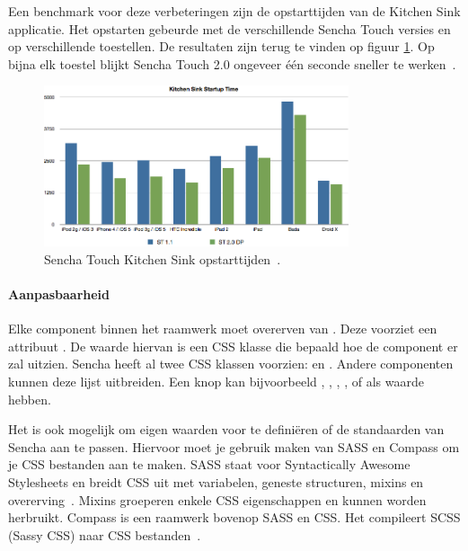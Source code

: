 Een benchmark voor deze verbeteringen zijn de opstarttijden van de Kitchen Sink applicatie.  Het opstarten gebeurde met de verschillende Sencha Touch versies en op verschillende toestellen.  De resultaten zijn terug te vinden op figuur \ref{fig:sencha_performance}.  Op bijna elk toestel blijkt Sencha Touch 2.0 ongeveer één seconde sneller te werken~\cite{SenchaInc.2013}.

\begin{figure}
  \centering
  \includegraphics[width=0.8\textwidth]{figuren/sencha-touch-startup-times.png}
  \caption{Sencha Touch Kitchen Sink opstarttijden~\cite{SenchaInc.2013}.}
  \label{fig:sencha_performance}
\end{figure}

\paragraph{Aanpasbaarheid}
\label{sec:sencha-aanpasbaarheid}
Elke component binnen het raamwerk moet overerven van .  Deze voorziet een attribuut .  De waarde hiervan is een CSS klasse die bepaald hoe de component er zal uitzien.  Sencha heeft al twee CSS klassen voorzien:   en .  Andere componenten kunnen deze lijst uitbreiden.  Een knop kan bijvoorbeeld ,  ,  ,  ,   of  als  waarde hebben.

Het is ook mogelijk om eigen waarden voor  te definiëren of de standaarden van Sencha aan te passen.  Hiervoor moet je gebruik maken van SASS en Compass om je CSS bestanden aan te maken.  SASS staat voor Syntactically Awesome Stylesheets en breidt CSS uit met variabelen,  geneste structuren,  mixins en overerving~\cite{Eppstein2013}.  Mixins groeperen enkele CSS eigenschappen en kunnen worden herbruikt.  Compass is een raamwerk bovenop SASS en CSS.  Het compileert SCSS (Sassy CSS) naar CSS bestanden~\cite{Eppstein2013a}.        

